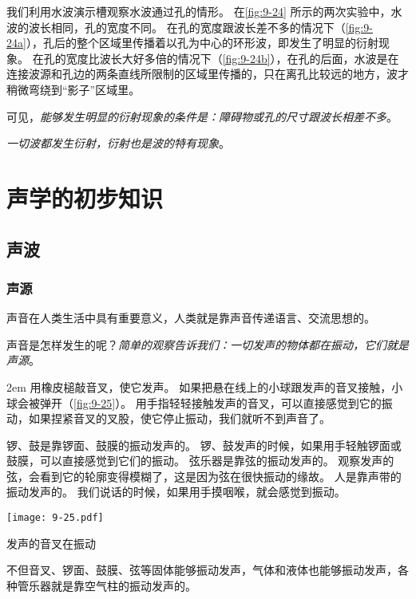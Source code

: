 我们利用水波演示槽观察水波通过孔的情形。
在\cref{fig:9-24} 所示的两次实验中，水波的波长相同，孔的宽度不同。
在孔的宽度跟波长差不多的情况下（\cref{fig:9-24a}），孔后的整个区域里传播着以孔为中心的环形波，即发生了明显的衍射现象。
在孔的宽度比波长大好多倍的情况下（\cref{fig:9-24b}），在孔的后面，水波是在连接波源和孔边的两条直线所限制的区域里传播的，只在离孔比较远的地方，波才稍微弯绕到“影子”区域里。

可见，\emph{能够发生明显的衍射现象的条件是：障碍物或孔的尺寸跟波长相差不多}。

\emph{一切波都发生衍射，衍射也是波的特有现象}。

\section{声学的初步知识}
\subsection{声波}
\subsubsection{声源} 
声音在人类生活中具有重要意义，人类就是靠声音传递语言、交流思想的。

声音是怎样发生的呢？\emph{简单的观察告诉我们：一切发声的物体都在振动，它们就是声源}。

\par\medskip\noindent
\begin{minipage}{0.64\linewidth}\parindent2em
用橡皮槌敲音叉，使它发声。
如果把悬在线上的小球跟发声的音叉接触，小球会被弹开（\cref{fig:9-25}）。
用手指轻轻接触发声的音叉，可以直接感觉到它的振动，如果捏紧音叉的叉股，使它停止振动，我们就听不到声音了。

锣、鼓是靠锣面、鼓膜的振动发声的。
锣、鼓发声的时候，如果用手轻触锣面或鼓膜，可以直接感觉到它们的振动。
弦乐器是靠弦的振动发声的。
观察发声的弦，会看到它的轮廓变得模糊了，这是因为弦在很快振动的缘故。
人是靠声带的振动发声的。
我们说话的时候，如果用手摸咽喉，就会感觉到振动。
\end{minipage}\hfill
\begin{minipage}{0.33\linewidth}\centering
\begin{figurehere}
  \texttt{[image: 9-25.pdf]}
  \caption{发声的音叉在振动}\label{fig:9-25}
\end{figurehere}
\end{minipage}

\medskip
不但音叉、锣面、鼓膜、弦等固体能够振动发声，气体和液体也能够振动发声，各种管乐器就是靠空气柱的振动发声的。


